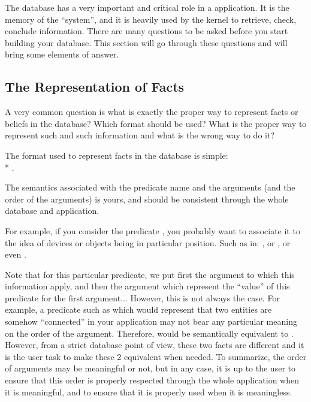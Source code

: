 The database has a very important and critical role in a \COPRS{}
application. It is the memory of the ``system'', and it is heavily used
by the kernel to retrieve, check, conclude information. There are many
questions to be asked before you start building your database. This
section will go through these questions and will bring some elements of
answer.



\subsection{The Representation of Facts}

A very common question is what is exactly the proper way to represent
facts or beliefs in the database? Which format should be used? What is
the proper way to represent such and such information and what is the
wrong way to do it?

The format used to represent facts in the database is simple: \\*
.

The semantics associated with the predicate name and the arguments (and
the order of the arguments) is yours, and should be consistent through
the whole database and application.

For example, if you consider the predicate , you probably
want to associate it to the idea of devices or objects being in
particular position. Such as in: , or
, or even .

Note that for this particular predicate, we put first the argument to which
this information apply, and then the argument which represent the ``value''
of this predicate for the first argument... However, this is not always
the case. For example, a predicate such as  which would
represent that two entities are somehow ``connected'' in your application
may not bear any particular meaning on the order of the argument.
Therefore,  would be semantically equivalent to
. However, from a strict database point of view,
these two facts are different and it is the user task to make these 2
equivalent when needed. To summarize, the order of arguments may be
meaningful or not, but in any case, it is up to the user to ensure that
this order is properly respected through the whole application when it is
meaningful, and to ensure that it is properly used when it is meaningless.

